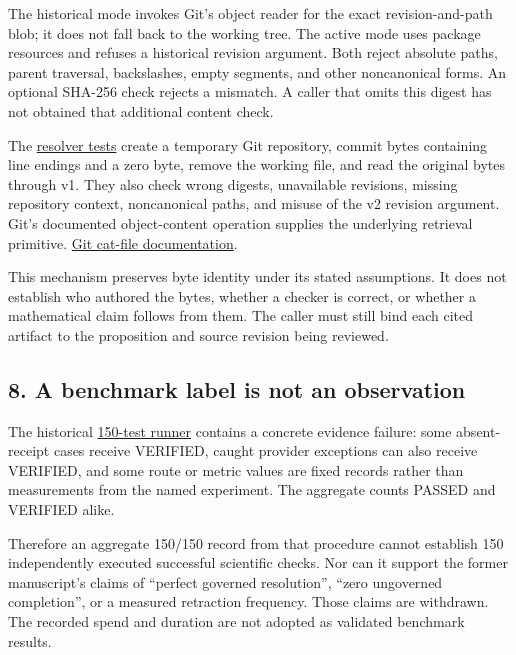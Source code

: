 \documentclass[
  11pt,
]{article}
\begin{document}
The historical mode invokes Git's object reader for the exact
revision-and-path blob; it does not fall back to the working tree. The
active mode uses package resources and refuses a historical revision
argument. Both reject absolute paths, parent traversal, backslashes,
empty segments, and other noncanonical forms. An optional SHA-256 check
rejects a mismatch. A caller that omits this digest has not obtained
that additional content check.

The
\href{https://github.com/dbccpage/the_symbol_game/blob/52cb5457f6c485ba548cfd292f6012a941ed22cf/operations/tests/level_engine/test_evidence_resolver.py}{resolver
tests} create a temporary Git repository, commit bytes containing line
endings and a zero byte, remove the working file, and read the original
bytes through v1. They also check wrong digests, unavailable revisions,
missing repository context, noncanonical paths, and misuse of the v2
revision argument. Git's documented object-content operation supplies
the underlying retrieval primitive.
\href{https://git-scm.com/docs/git-cat-file}{Git cat-file
documentation}.

This mechanism preserves byte identity under its stated assumptions. It
does not establish who authored the bytes, whether a checker is correct,
or whether a mathematical claim follows from them. The caller must still
bind each cited artifact to the proposition and source revision being
reviewed.

\hypertarget{a-benchmark-label-is-not-an-observation}{%
\subsection{8. A benchmark label is not an
observation}\label{a-benchmark-label-is-not-an-observation}}

The historical
\href{https://github.com/dbccpage/the_symbol_game/blob/52cb5457f6c485ba548cfd292f6012a941ed22cf/projects/mssn_sn_symgam/challenges/run_150_tests_suite.py}{150-test
runner} contains a concrete evidence failure: some absent-receipt cases
receive VERIFIED, caught provider exceptions can also receive VERIFIED,
and some route or metric values are fixed records rather than
measurements from the named experiment. The aggregate counts PASSED and
VERIFIED alike.

Therefore an aggregate 150/150 record from that procedure cannot
establish 150 independently executed successful scientific checks. Nor
can it support the former manuscript's claims of ``perfect governed
resolution'', ``zero ungoverned completion'', or a measured retraction
frequency. Those claims are withdrawn. The recorded spend and duration
are not adopted as validated benchmark results.
\end{document}
